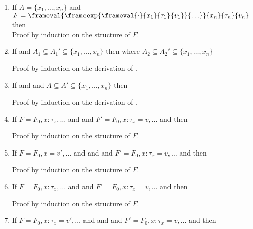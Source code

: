 \begin{enumerate}
\item \label{constructA} If $A = \{x_1, \ldots, x_n\}$ and $F = \frameval{\frameexp{\frameval{\cdot}{x_1}{\tau_1}{v_1}}{\ldots}}{x_n}{\tau_n}{v_n}$ then  \\

  Proof by induction on the structure of $F$.

\item \label{extendAassign}
  If  and $A_1 \subseteq A_1' \subseteq \{x_1,\ldots,x_n\}$
  then  where $A_2 \subseteq A_2' \subseteq \{x_1,\ldots,x_n\}$

  Proof by induction on the derivation of .

\item \label{extendAframetype}
  If  and  and $A \subseteq A' \subseteq \{x_1,\ldots,x_n\}$
  then 

  Proof by induction on the derivation of .

\item \label{assignfirstassigned}
  If $F = F_0,x:\tau_x,\ldots$ and  and $F' = F_0,x:\tau_x=v,\ldots$ and 
  then 

  Proof by induction on the structure of $F$.
\item \label{assignassigned}
  If $F = F_0,x=v',\ldots$ and  and  and $F' = F_0,x:\tau_x=v,\ldots$ and 
  then 

  Proof by induction on the structure of $F$.

\item \label{assignfirstctx}
  If $F = F_0,x:\tau_x,\ldots$ and  and $F' = F_0,x:\tau_x=v,\ldots$ and 
  then 

  Proof by induction on the structure of $F$.
\item \label{assignctx}
  If $F = F_0,x:\tau_x=v',\ldots$ and  and  and $F' = F_0,x:\tau_x=v,\ldots$ and 
  then 


\end{enumerate}
